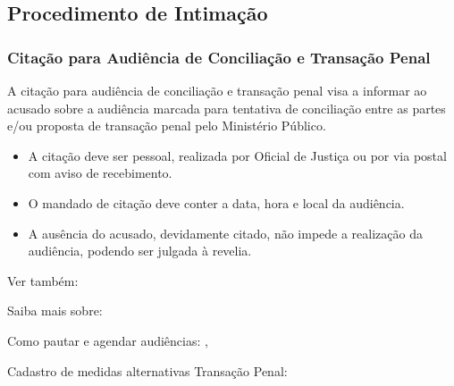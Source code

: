 \documentclass[letterpaper,10pt,brazil]{sphinxmanual}
\begin{document}
\subsection{Procedimento de Intimação}
\label{\detokenize{06atosintimatorios:procedimento-de-intimacao}}

\subsubsection{Citação para Audiência de Conciliação e Transação Penal}
\label{\detokenize{06atosintimatorios:citacao-para-audiencia-de-conciliacao-e-transacao-penal}}
\sphinxAtStartPar
{}

\sphinxAtStartPar
A citação para audiência de conciliação e transação penal visa a informar ao acusado sobre a audiência marcada para tentativa de conciliação entre as partes e/ou proposta de transação penal pelo Ministério Público.

\sphinxAtStartPar
{}
\begin{itemize}
\item {} 
\sphinxAtStartPar
A citação deve ser pessoal, realizada por Oficial de Justiça ou por via postal com aviso de recebimento.

\item {} 
\sphinxAtStartPar
O mandado de citação deve conter a data, hora e local da audiência.

\item {} 
\sphinxAtStartPar
A ausência do acusado, devidamente citado, não impede a realização da audiência, podendo ser julgada à revelia.

\end{itemize}


\begin{sphinxseealso}{Ver também:}

\sphinxAtStartPar
Saiba mais sobre:

\sphinxAtStartPar
Como pautar e agendar audiências: {\hyperref[\detokenize{projud_45_listasaudiencias::doc}]{}}, {\hyperref[\detokenize{projud_46_comopautaraudiencia::doc}]{}}

\sphinxAtStartPar
Cadastro de medidas alternativas \sphinxhyphen{} Transação Penal: {\hyperref[\detokenize{projud_54_cadastromedidasalternativas::doc}]{}}


\end{sphinxseealso}
\end{document}
